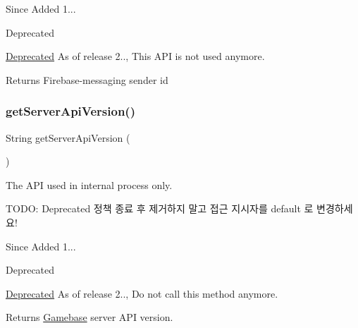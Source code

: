 \begin{DoxySince}{Since}
Added 1... 
\end{DoxySince}
\begin{DoxyRefDesc}{Deprecated}
\item[\hyperlink{deprecated__deprecated000007}{Deprecated}]As of release 2.., This A\+PI is not used anymore. \end{DoxyRefDesc}
\begin{DoxyReturn}{Returns}
Firebase-\/messaging sender id 
\end{DoxyReturn}
\mbox{\label{classcom_1_1toast_1_1android_1_1gamebase_1_1_gamebase_configuration_af74623fc60ebad6b08ba78668d4961cc}} 
\subsubsection{\texorpdfstring{get\+Server\+Api\+Version()}{getServerApiVersion()}}
{\footnotesize\ttfamily String get\+Server\+Api\+Version (\begin{DoxyParamCaption}{ }\end{DoxyParamCaption})}



The A\+PI used in internal process only. 

T\+O\+DO\+: Deprecated 정책 종료 후 제거하지 말고 접근 지시자를 default 로 변경하세요!

\begin{DoxySince}{Since}
Added 1... 
\end{DoxySince}
\begin{DoxyRefDesc}{Deprecated}
\item[\hyperlink{deprecated__deprecated000005}{Deprecated}]As of release 2.., Do not call this method anymore. \end{DoxyRefDesc}
\begin{DoxyReturn}{Returns}
\hyperlink{classcom_1_1toast_1_1android_1_1gamebase_1_1_gamebase}{Gamebase} server A\+PI version. 
\end{DoxyReturn}
\mbox{\label{classcom_1_1toast_1_1android_1_1gamebase_1_1_gamebase_configuration_ac53dc9a5d7c5e8a4aa816b4476a8c93f}} 
